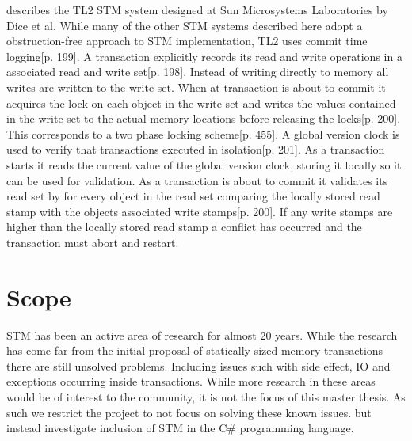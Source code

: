 \cite{dice2006transactional} describes the TL2 \ac{STM} system designed at Sun Microsystems Laboratories by Dice et al. While many of the other \ac{STM} systems described here adopt a obstruction-free approach to \ac{STM} implementation, TL2 uses commit time logging\cite{dice2006transactional}[p. 199]. A transaction explicitly records its read and write operations in a associated read and write set\cite{dice2006transactional}[p. 198]. Instead of writing directly to memory all writes are written to the write set. When at transaction is about to commit it acquires the lock on each object in the write set and writes the values contained in the write set to the actual memory locations before releasing the locks\cite{dice2006transactional}[p. 200]. This corresponds to a two phase locking scheme\cite{tanenbaum2008modern}[p. 455]. A global version clock is used to verify that transactions executed in isolation\cite{dice2006transactional}[p. 201]. As a transaction starts it reads the current value of the global version clock, storing it locally so it can be used for validation. As a transaction is about to commit it validates its read set by for every object in the read set comparing the locally stored read stamp with the objects associated write stamps\cite{dice2006transactional}[p. 200]. If any write stamps are higher than the locally stored read stamp a conflict has occurred and the transaction must abort and restart. 


\section{Scope}
\ac{STM} has been an active area of research for almost 20 years\cite{shavit1997software}. While the research has come far from the initial proposal of statically sized memory transactions there are still unsolved problems. Including issues such with side effect, \ac{IO} and exceptions occurring inside transactions. While more research in these areas would be of interest to the community, it is not the focus of this master thesis. As such we restrict the project to not focus on solving these known issues. but instead investigate inclusion of \ac{STM} in the C\# programming language.

